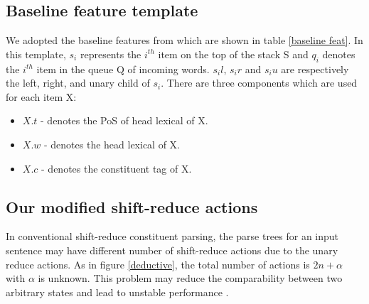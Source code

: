 

\subsection{Baseline feature template}
We adopted the baseline features from \cite{2009Zhang} which are shown in table \ref{baseline feat}. In this template, $s_i$ represents the $i^{th}$ item on the top of the stack S and $q_i$ denotes the $i^{th}$ item in the queue Q of incoming words. $s_il$, $s_ir$ and $s_iu$ are respectively the left, right, and unary child of $s_i$. There are three components which are used for each item X:
\begin{itemize}
	\item $X.t$ - denotes the PoS of head lexical of X.
	\item $X.w$ - denotes the head lexical of X.
	\item $X.c$ - denotes the constituent tag of X.
\end{itemize}

\subsection{Our modified shift-reduce actions}
In conventional shift-reduce constituent parsing, the parse trees for an input sentence may have different number of shift-reduce actions due to the unary reduce actions. As in figure \ref{deductive}, the total number of actions is $2n + \alpha$ with $\alpha$ is unknown. This problem may reduce the comparability between two arbitrary states and lead to unstable performance \cite{2009Zhang}.

